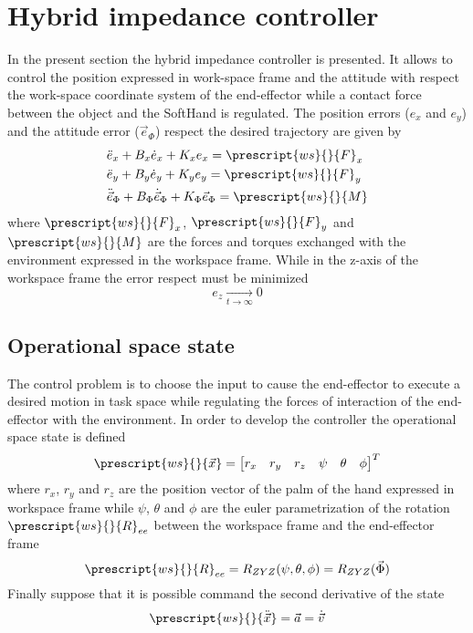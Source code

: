 \section{Hybrid impedance controller}
In the present section the hybrid impedance controller is presented. 
It allows to control the position expressed in work-space frame and the attitude 
with respect the work-space coordinate system of the end-effector while a contact 
force between the object and the SoftHand is regulated.
The position errors ($e_x$ and $e_y$) and the attitude error ($\vec{e}_{\Phi}$) respect the desired trajectory are given by
\[
\begin{split}
  &\ddot{e}_{x} + B_x \dot{e}_x + K_x e_x = \prescript{ws}{}{F}_x\\
  &\ddot{e}_{y} + B_y \dot{e}_y + K_y e_y = \prescript{ws}{}{F}_y\\
  &\ddot{\vec{e}}_{\Phi} + B_{\Phi} \dot{\vec{e}}_{\Phi} + K_{\Phi} \vec{e}_{\Phi} = \prescript{ws}{}{M}
\end{split}
\]
where $\prescript{ws}{}{F}_x$, $\prescript{ws}{}{F}_y$ and 
$\prescript{ws}{}{M}$ are the forces and torques
exchanged with the environment expressed in the workspace frame. 
While in the z-axis of the workspace frame the error respect must be minimized
\[
e_z \xrightarrow[t \to \infty]{} 0
\]

\subsection{Operational space state}
The control problem is to choose the input to cause the end-effector 
to execute a desired motion in task space while regulating the 
forces of interaction of the end-effector with the environment.
In order to develop the controller the operational space state is defined
\begin{equation}
  \label{eq:state_space}
  \prescript{ws}{}{\vec{x}} = 
  \begin{bmatrix}
    r_x & r_y & r_z & \psi & \theta & \phi
  \end{bmatrix}^T
\end{equation}
where $r_x$, $r_y$ and $r_z$ are the position vector of the palm 
of the hand expressed in workspace frame while $\psi$, $\theta$ and 
$\phi$ are the euler parametrization of the rotation 
$\prescript{ws}{}{R}_{ee}$ between the workspace frame and the end-effector frame
\[
\prescript{ws}{}{R}_{ee} = R_{ZYZ}(\psi, \theta, \phi) = R_{ZYZ}(\vec{\Phi})
\]
Finally suppose that it is possible command the second derivative of the state
\[
\prescript{ws}{}{\ddot{\vec{x}}} = \vec{a} = \dot{\vec{v}}
\]

